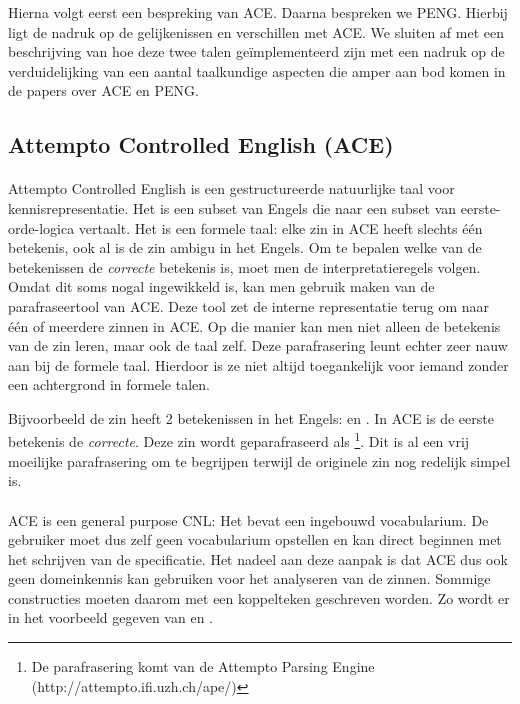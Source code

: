 Hierna volgt eerst een bespreking van ACE. Daarna bespreken we PENG. Hierbij ligt de nadruk op de gelijkenissen en verschillen met ACE. We sluiten af met een beschrijving van hoe deze twee talen ge\"implementeerd zijn met een nadruk op de verduidelijking van een aantal taalkundige aspecten die amper aan bod komen in de papers over ACE en PENG.

\subsection{Attempto Controlled English (ACE)}
\paragraph{} Attempto Controlled English \cite{Fuchs2008} is een gestructureerde natuurlijke taal voor kennisrepresentatie. Het is een subset van Engels die naar een subset van eerste-orde-logica vertaalt. Het is een formele taal: elke zin in ACE heeft slechts \'e\'en betekenis, ook al is de zin ambigu in het Engels. Om te bepalen welke van de betekenissen de \textit{correcte} betekenis is, moet men de interpretatieregels volgen. Omdat dit soms nogal ingewikkeld is, kan men gebruik maken van de parafraseertool van ACE. Deze tool zet de interne representatie terug om naar \'e\'en of meerdere zinnen in ACE. Op die manier kan men niet alleen de betekenis van de zin leren, maar ook de taal zelf. Deze parafrasering leunt echter zeer nauw aan bij de formele taal. Hierdoor is ze niet altijd toegankelijk voor iemand zonder een achtergrond in formele talen.

Bijvoorbeeld de zin  heeft 2 betekenissen in het Engels:  en . In ACE is de eerste betekenis de \textit{correcte}. Deze zin wordt geparafraseerd als \footnote{De parafrasering komt van de Attempto Parsing Engine (http://attempto.ifi.uzh.ch/ape/)}. Dit is al een vrij moeilijke parafrasering om te begrijpen terwijl de originele zin nog redelijk simpel is.

\paragraph{}ACE is een general purpose CNL: Het bevat een ingebouwd vocabularium. De gebruiker moet dus zelf geen vocabularium opstellen en kan direct beginnen met het schrijven van de specificatie. Het nadeel aan deze aanpak is dat ACE dus ook geen domeinkennis kan gebruiken voor het analyseren van de zinnen. Sommige constructies moeten daarom met een koppelteken geschreven worden. Zo wordt er in \cite{ACEConstructionRules} het voorbeeld gegeven van  en .

